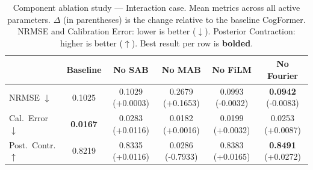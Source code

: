 \begin{table}[t]
\centering
\caption{Component ablation study — Interaction case. Mean metrics across
all active parameters. $\Delta$ (in parentheses) is the change relative to the
baseline CogFormer. NRMSE and Calibration Error: lower is better ($\downarrow$).
Posterior Contraction: higher is better ($\uparrow$). Best result per row is
\textbf{bolded}.}
\label{tab:component_ablation_interaction}
\begin{tabular}{lccccc}
\toprule
 & Baseline & No SAB & No MAB & No FiLM & No Fourier \\
\midrule
NRMSE $\downarrow$ & 0.1025 & 0.1029 \small{(+0.0003)} & 0.2679 \small{(+0.1653)} & 0.0993 \small{(-0.0032)} & \textbf{0.0942} \small{(-0.0083)} \\
Cal.\ Error $\downarrow$ & \textbf{0.0167} & 0.0283 \small{(+0.0116)} & 0.0182 \small{(+0.0016)} & 0.0199 \small{(+0.0032)} & 0.0253 \small{(+0.0087)} \\
Post.\ Contr. $\uparrow$ & 0.8219 & 0.8335 \small{(+0.0116)} & 0.0286 \small{(-0.7933)} & 0.8383 \small{(+0.0165)} & \textbf{0.8491} \small{(+0.0272)} \\
\bottomrule
\end{tabular}
\end{table}
